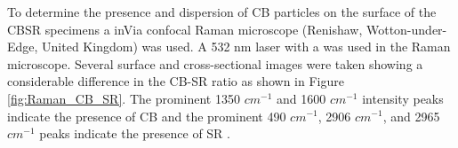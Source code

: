 To determine the presence and dispersion of CB particles on the surface of the CBSR specimens a inVia confocal Raman microscope (Renishaw, Wotton-under-Edge, United Kingdom) was used. A 532 nm laser with a was used in the Raman microscope. Several surface and cross-sectional images were taken showing a considerable difference in the CB-SR ratio as shown in Figure \ref{fig:Raman_CB_SR}. The prominent 1350 $cm^{-1}$ and 1600 $cm^{-1}$ intensity peaks indicate the presence of CB and the prominent 490 $cm^{-1}$, 2906 $cm^{-1}$, and 2965 $cm^{-1}$ peaks indicate the presence of SR \cite{Pawlyta2015,RamanLife2024}. 
\begin{figure}[H]
	\centering
    \begin{minipage}[t]{.45\textwidth}
    	\centering
    	\vspace{1cm}
		\vfill
		\vspace{0.2cm}
\end{minipage}
\end{figure}
